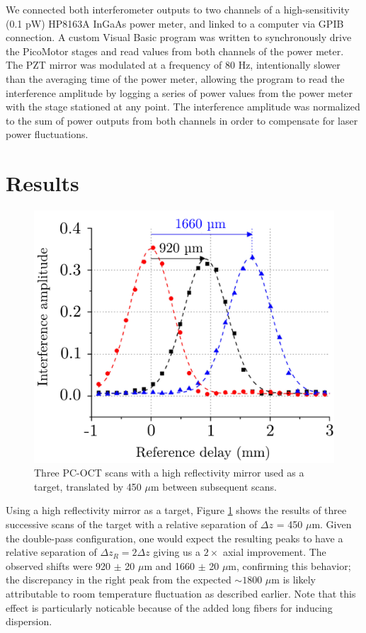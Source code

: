 We connected both interferometer outputs to two channels of a high-sensitivity (0.1 pW) HP8163A InGaAs power meter, and linked to a computer via GPIB connection. A custom Visual Basic program was written to synchronously drive the PicoMotor stages and read values from both channels of the power meter. The PZT mirror was modulated at a frequency of 80 Hz, intentionally slower than the averaging time of the power meter, allowing the program to read the interference amplitude by logging a series of power values from the power meter with the stage stationed at any point. The interference amplitude was normalized to the sum of power outputs from both channels in order to compensate for laser power fluctuations.

\section{Results}

\begin{figure}[t]
\begin{center}
\includegraphics[width=12cm]{figure-pcoct-result.pdf}
\caption{Three PC-OCT scans with a high reflectivity mirror used as a target, translated by 450 $\mu$m between subsequent scans.}
\label{figure:pcoct-result}
\end{center}
\end{figure}

Using a high reflectivity mirror as a target, Figure \ref{figure:pcoct-result} shows the results of three successive scans of the target with a relative separation of $\Delta z$ = 450 $\mu$m. Given the double-pass configuration, one would expect the resulting peaks to have a relative separation of $\Delta z_R = 2\Delta z$ giving us a $2\times$ axial improvement. The observed shifts were 920 $\pm$ 20 $\mu$m and 1660 $\pm$ 20 $\mu$m, confirming this behavior; the discrepancy in the right peak from the expected $\sim 1800$ $\mu$m is likely attributable to room temperature fluctuation as described earlier. Note that this effect is particularly noticable because of the added long fibers for inducing dispersion.

